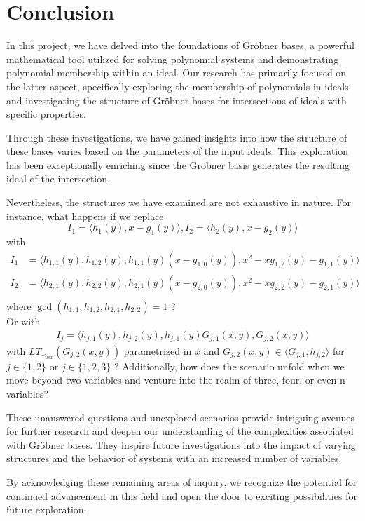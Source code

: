 \documentclass{article}
\begin{document}
\section{Conclusion}

\par In this project, we have delved into the foundations of Gröbner bases, a powerful mathematical tool utilized for solving polynomial systems and demonstrating polynomial membership within an ideal.
Our research has primarily focused on the latter aspect, specifically exploring the membership of polynomials in ideals and investigating the structure of Gröbner bases for intersections of ideals with specific properties.
\par Through these investigations, we have gained insights into how the structure of these bases varies based on the parameters of the input ideals.
This exploration has been exceptionally enriching since the Gröbner basis generates the resulting ideal of the intersection. 
\par Nevertheless, the structures we have examined are not exhaustive in nature. 
For instance, what happens if we replace 
\begin{displaymath}
    I_{1} = \langle h_{1}(y), x - g_{1}(y) \rangle, I_{2} = \langle h_{2}(y), x - g_{2}(y) \rangle
\end{displaymath}
with 
\begin{align*}
    I_{1} & = \langle h_{1,1}(y), h_{1,2}(y), h_{1,1}(y)(x - g_{1,0}(y)), x^{2}-xg_{1,2}(y)-g_{1,1}(y) \rangle  \\
    I_{2} & = \langle h_{2,1}(y), h_{2,2}(y), h_{2,1}(y)(x - g_{2,0}(y)), x^{2}-xg_{2,2}(y)-g_{2,1}(y) \rangle \\
\end{align*}
where $\gcd(h_{1,1},h_{1,2},h_{2,1},h_{2,2}) = 1$ ? \\
Or with 
\begin{align*}
    I_{j} = \langle h_{j,1}(y), h_{j,2}(y), h_{j,1}(y)G_{j,1}(x,y),G_{j,2}(x,y) \rangle
\end{align*}
with $LT_{\prec_{lex}}(G_{j,2}(x,y))$ parametrized in $x$ and $G_{j,2}(x,y) \in \langle G_{j,1},h_{j,2} \rangle$ for $j\in\{1,2\}$ or $j\in\{1,2,3\}$  ?
Additionally, how does the scenario unfold when we move beyond two variables and venture into the realm of three, four, or even n variables? 
\par These unanswered questions and unexplored scenarios provide intriguing avenues for further research and deepen our understanding of the complexities associated with Gröbner bases. They inspire future investigations into the impact of varying structures and the behavior of systems with an increased number of variables. 
\par By acknowledging these remaining areas of inquiry, we recognize the potential for continued advancement in this field and open the door to exciting possibilities for future exploration.


\nocite{*}
\printbibliography
\end{document}
